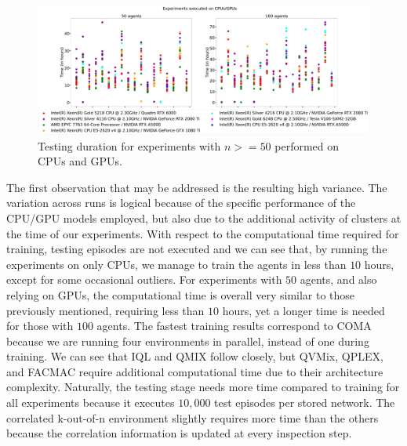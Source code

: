 \begin{figure}
    \centering
    \includegraphics[width=\textwidth]{tex_thesis/figures/ch5/testing_time_gpu.pdf}
    \caption{Testing duration for experiments with $n>=50$ performed on CPUs and GPUs.}
    \label{fig:testing_time_gpu}
\end{figure}

The first observation that may be addressed is the resulting high variance. 
The variation across runs is logical because of the specific performance of the CPU/GPU models employed, but also due to the additional activity of clusters at the time of our experiments.
With respect to the computational time required for training, testing episodes are not executed and we can see that, by running the experiments on only CPUs, we manage to train the agents in less than $10$ hours, except for some occasional outliers.
For experiments with $50$ agents, and also relying on GPUs, the computational time is overall very similar to those previously mentioned, requiring less than $10$ hours, yet a longer time is needed for those with $100$ agents.
The fastest training results correspond to COMA because we are running four environments in parallel, instead of one during training.
We can see that IQL and QMIX follow closely, but QVMix, QPLEX, and FACMAC require additional computational time due to their architecture complexity.
Naturally, the testing stage needs more time compared to training for all experiments because it executes $10,000$ test episodes per stored network.
The correlated k-out-of-n environment slightly requires more time than the others because the correlation information is updated at every inspection step.


